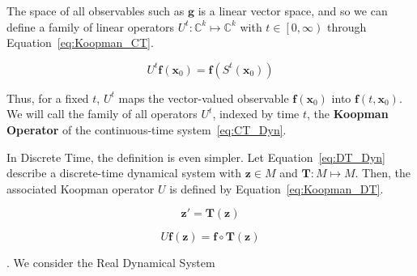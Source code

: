 \documentclass{article}
\begin{document}
    The space of all observables such as $\mathbf{g}$ is a linear vector space, and so we can define a family of linear operators $U^t:\mathbb{C}^k \mapsto \mathbb{C}^k$ with $t \in \left[0,\infty\right)$ through Equation~\ref{eq:Koopman_CT}.

    \begin{equation} \label{eq:Koopman_CT}
        U^t \mathbf{f}\left(\mathbf{x}_0\right) = \mathbf{f} \left(S^t \left(\mathbf{x}_0\right)\right)
    \end{equation}

    Thus, for a fixed $t$, $U^t$ maps the vector-valued observable $\mathbf{f}(\mathbf{x}_0)$ into $\mathbf{f}\left(t,\mathbf{x}_0\right)$. We will call the family of all operators $U^t$, indexed by time $t$, the \textbf{Koopman Operator} of the continuous-time system~\ref{eq:CT_Dyn}.

    In Discrete Time, the definition is even simpler. Let Equation~\ref{eq:DT_Dyn} describe a discrete-time dynamical system with $\mathbf{z} \in M$ and $\mathbf{T}:M \mapsto M$. Then, the associated Koopman operator $U$ is defined by Equation~\ref{eq:Koopman_DT}.

    \begin{equation} \label{eq:DT_Dyn}
        \textbf{z}' = \textbf{T}\left(\textbf{z}\right)
    \end{equation}

    \begin{equation} \label{eq:Koopman_DT}
        U\mathbf{f}\left(\mathbf{z}\right) = \mathbf{f} \circ \mathbf{T} \left(\mathbf{z}\right)
    \end{equation}

\begin{comment}
    At this point, it is worth noting that the discrete-time Koopman operator is also linear; i.e., $U\left(c_1 \mathbf{f}_1\left(\mathbf{z}\right) + c_2 \mathbf{f}_2\left(\mathbf{z}\right)\right) =
    c_1 \mathbf{f}_1\left(\mathbf{T}\left(\mathbf{z}\right)\right) + c_2 \mathbf{f}_2\left(\mathbf{T}\left(\mathbf{z}\right)\right) =
    c_1 U\mathbf{f}_1\left(\mathbf{z}\right) + c_2 U\mathbf{f}_2\left(\mathbf{z}\right)$.
    
    Taking advantage of this linearity, we denote as $\phi : M \mapsto \mathbb{C}$ an eigenfunction of the Koopman operator $U$, associated to an eigenvalue $\lambda \in \mathbb{C}$.
\end{comment}
    
    \cite{Goncalves}. We consider the Real Dynamical System
\end{document}

